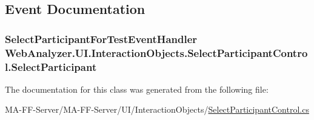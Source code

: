 \subsection{Event Documentation}
\hypertarget{class_web_analyzer_1_1_u_i_1_1_interaction_objects_1_1_select_participant_control_aed961b133694321fc9ba8bf431ade028}{}
\subsubsection[{Select\+Participant}]{\setlength{\rightskip}{0pt plus 5cm}Select\+Participant\+For\+Test\+Event\+Handler Web\+Analyzer.\+U\+I.\+Interaction\+Objects.\+Select\+Participant\+Control.\+Select\+Participant}\label{class_web_analyzer_1_1_u_i_1_1_interaction_objects_1_1_select_participant_control_aed961b133694321fc9ba8bf431ade028}


The documentation for this class was generated from the following file\+:\begin{DoxyCompactItemize}
\item 
M\+A-\/\+F\+F-\/\+Server/\+M\+A-\/\+F\+F-\/\+Server/\+U\+I/\+Interaction\+Objects/\hyperlink{_select_participant_control_8cs}{Select\+Participant\+Control.\+cs}\end{DoxyCompactItemize}
